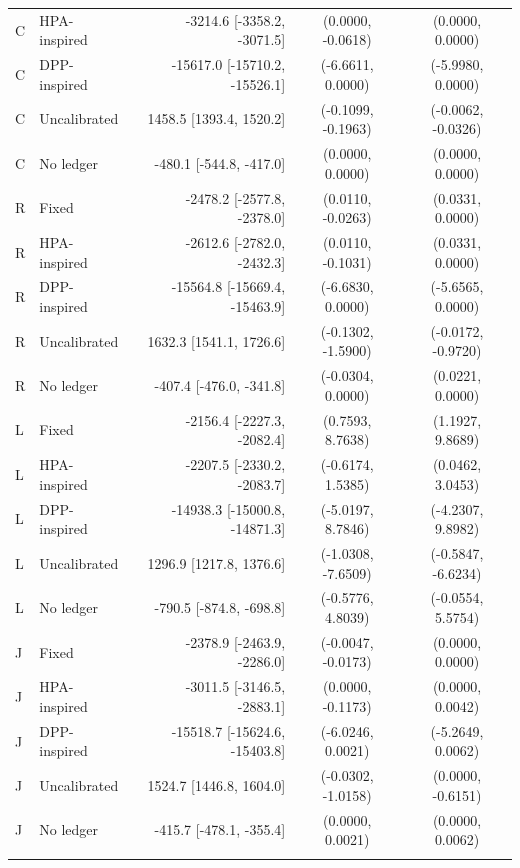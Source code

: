 \documentclass{IEEEoj}
\begin{document}
\begin{table}[!htbp]
\begin{tabular}{llrcc}
C & HPA-inspired & -3214.6 [-3358.2, -3071.5] & (0.0000, -0.0618) & (0.0000, 0.0000) \\
C & DPP-inspired & -15617.0 [-15710.2, -15526.1] & (-6.6611, 0.0000) & (-5.9980, 0.0000) \\
C & Uncalibrated & 1458.5 [1393.4, 1520.2] & (-0.1099, -0.1963) & (-0.0062, -0.0326) \\
C & No ledger & -480.1 [-544.8, -417.0] & (0.0000, 0.0000) & (0.0000, 0.0000) \\
\addlinespace
R & Fixed & -2478.2 [-2577.8, -2378.0] & (0.0110, -0.0263) & (0.0331, 0.0000) \\
R & HPA-inspired & -2612.6 [-2782.0, -2432.3] & (0.0110, -0.1031) & (0.0331, 0.0000) \\
R & DPP-inspired & -15564.8 [-15669.4, -15463.9] & (-6.6830, 0.0000) & (-5.6565, 0.0000) \\
R & Uncalibrated & 1632.3 [1541.1, 1726.6] & (-0.1302, -1.5900) & (-0.0172, -0.9720) \\
R & No ledger & -407.4 [-476.0, -341.8] & (-0.0304, 0.0000) & (0.0221, 0.0000) \\
\addlinespace
L & Fixed & -2156.4 [-2227.3, -2082.4] & (0.7593, 8.7638) & (1.1927, 9.8689) \\
L & HPA-inspired & -2207.5 [-2330.2, -2083.7] & (-0.6174, 1.5385) & (0.0462, 3.0453) \\
L & DPP-inspired & -14938.3 [-15000.8, -14871.3] & (-5.0197, 8.7846) & (-4.2307, 9.8982) \\
L & Uncalibrated & 1296.9 [1217.8, 1376.6] & (-1.0308, -7.6509) & (-0.5847, -6.6234) \\
L & No ledger & -790.5 [-874.8, -698.8] & (-0.5776, 4.8039) & (-0.0554, 5.5754) \\
\addlinespace
J & Fixed & -2378.9 [-2463.9, -2286.0] & (-0.0047, -0.0173) & (0.0000, 0.0000) \\
J & HPA-inspired & -3011.5 [-3146.5, -2883.1] & (0.0000, -0.1173) & (0.0000, 0.0042) \\
J & DPP-inspired & -15518.7 [-15624.6, -15403.8] & (-6.0246, 0.0021) & (-5.2649, 0.0062) \\
J & Uncalibrated & 1524.7 [1446.8, 1604.0] & (-0.0302, -1.0158) & (0.0000, -0.6151) \\
J & No ledger & -415.7 [-478.1, -355.4] & (0.0000, 0.0021) & (0.0000, 0.0062) \\
\addlinespace
\bottomrule\end{tabular}\end{table}
\end{document}
